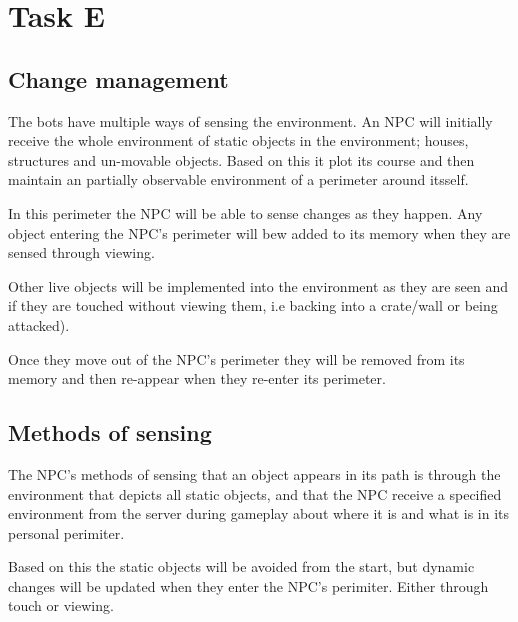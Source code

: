 
\chapter{Task E}
\section{Change management}
The bots have multiple ways of sensing the environment. An NPC will initially
receive the whole environment of static objects in the environment; houses,
structures and un-movable objects.  Based on this it plot its course and then
maintain an partially observable environment of a perimeter around itsself.

In this perimeter the NPC will be able to sense changes as they happen. Any
object entering the NPC's perimeter will bew added to its memory when they
are sensed through viewing.

Other live objects will be implemented into the environment as they are seen
and if they are touched without viewing them, i.e backing into a crate/wall or
being attacked).

Once they move out of the NPC's perimeter they will be removed from its memory
and then re-appear when they re-enter its perimeter.

\section{Methods of sensing}
The NPC's methods of sensing that an object appears in its path is through the
environment that depicts all static objects, and that the NPC receive a
specified environment from the server during gameplay about where it is and what
is in its personal perimiter.

Based on this the static objects will be avoided from the start, but dynamic
changes will be updated when they enter the NPC's perimiter.  Either through
touch or viewing.



